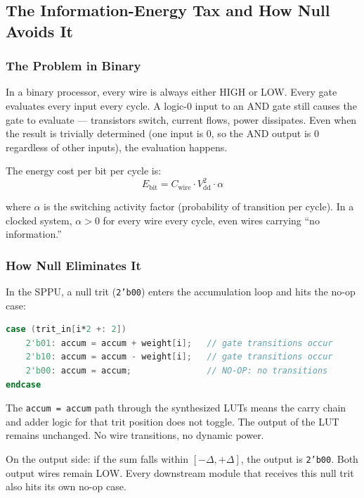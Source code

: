 \documentclass[11pt,a4paper]{article}
\begin{document}
\subsection{The Information-Energy Tax and How Null Avoids It}

\subsubsection{The Problem in Binary}

In a binary processor, every wire is always either HIGH or LOW. Every gate evaluates every input every cycle. A logic-0 input to an AND gate still causes the gate to evaluate --- transistors switch, current flows, power dissipates. Even when the result is trivially determined (one input is 0, so the AND output is 0 regardless of other inputs), the evaluation happens.

The energy cost per bit per cycle is:
\begin{equation}
E_{\text{bit}} = C_{\text{wire}} \cdot V_{\text{dd}}^2 \cdot \alpha
\end{equation}

where $\alpha$ is the switching activity factor (probability of transition per cycle). In a clocked system, $\alpha > 0$ for every wire every cycle, even wires carrying ``no information.''

\subsubsection{How Null Eliminates It}

In the SPPU, a null trit (\texttt{2'b00}) enters the accumulation loop and hits the no-op case:
\begin{lstlisting}[language=Verilog]
case (trit_in[i*2 +: 2])
    2'b01: accum = accum + weight[i];   // gate transitions occur
    2'b10: accum = accum - weight[i];   // gate transitions occur
    2'b00: accum = accum;               // NO-OP: no transitions
endcase
\end{lstlisting}

The \texttt{accum = accum} path through the synthesized LUTs means the carry chain and adder logic for that trit position does not toggle. The output of the LUT remains unchanged. No wire transitions, no dynamic power.

On the output side: if the sum falls within $[-\Delta, +\Delta]$, the output is \texttt{2'b00}. Both output wires remain LOW. Every downstream module that receives this null trit also hits its own no-op case.
\end{document}
